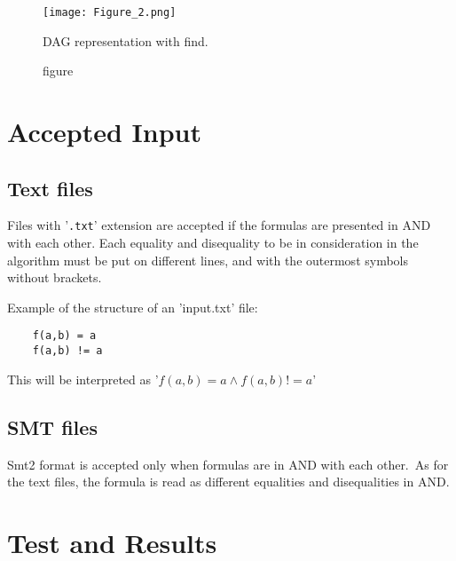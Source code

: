 \documentclass[11pt]{article}
\begin{document}
\begin{figure}[!htpb]
    \centering
    \texttt{[image: Figure\_2.png]}
    \caption{figure}{DAG representation with find.}
    \label{fig:enter-label}
\end{figure}

\newpage
\section{Accepted Input}

\subsection{Text files}

Files with '\texttt{.txt}' extension are accepted if the formulas are presented in AND with each other.
Each equality and disequality to be in consideration in the algorithm must be put on different lines, and with the outermost symbols without brackets.

Example of the structure of an 'input.txt' file:

\begin{verbatim}
    f(a,b) = a
    f(a,b) != a
\end{verbatim}

This will be interpreted as '$f(a,b) = a \land f(a,b) != a$'

\subsection{SMT files}

Smt2 format is accepted only when formulas are in AND with each other.\
As for the text files, the formula is read as different equalities and disequalities in AND.

\section{Test and Results}
\end{document}
